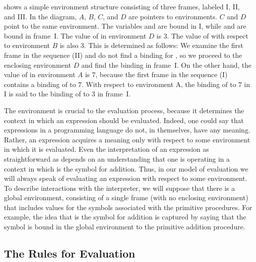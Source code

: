  shows a simple environment structure consisting of three frames, labeled I, II, and III.
In the diagram, \( A \), \( B \), \( C \), and \( D \) are pointers to environments.
\( C \) and \( D \) point to the same environment.
The variables  and  are bound in I, while  and  are bound in frame I.
The value of  in environment \( D \) is \( 3 \).
The value of  with respect to environment \( B \) is also \( 3 \).
This is determined as follows:
We examine the first frame in the sequence (II) and do not find a binding for , so we proceed to the enclosing environment \( D \) and find the binding in frame I.
On the other hand, the value of  in environment \( A \) is \( 7 \), because the first frame in the sequence (I) contains a binding of  to \( 7 \).
With respect to environment A, the binding of  to \( 7 \) in I is said to  the binding of  to \( 3 \) in frame I.

The environment is crucial to the evaluation process, because it determines the context in which an expression should be evaluated.
Indeed, one could say that expressions in a programming language do not, in themselves, have any meaning.
Rather, an expression acquires a meaning only with respect to some environment in which it is evaluated.
Even the interpretation of an expression as straightforward as  depends on an understanding that one is operating in a context in which \code{+} is the symbol for addition.
Thus, in our model of evaluation we will always speak of evaluating an expression with respect to some environment.
To describe interactions with the interpreter, we will suppose that there is a global environment, consisting of a single frame (with no enclosing environment) that includes values for the symbols associated with the primitive procedures.
For example, the idea that \code{+} is the symbol for addition is captured by saying that the symbol \code{+} is bound in the global environment to the primitive addition procedure.



\subsection{The Rules for Evaluation}
\label{Section 3.2.1}

